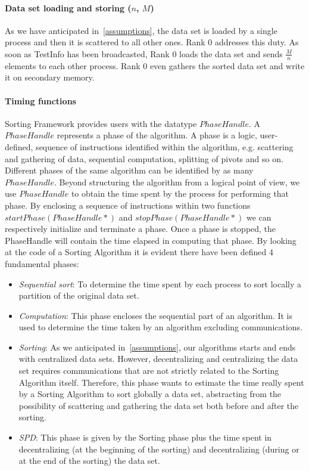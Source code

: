 \paragraph{Data set loading and storing ($n$, $M$)} As we have anticipated in~\ref{assumptions}, the data set is loaded by a single process and then it is scattered to all other ones. Rank $0$ addresses this duty. As soon as TestInfo has been broadcasted, Rank $0$ loads the data set and sends $\frac{M}{n}$ elements to each other process. Rank $0$ even gathers the sorted data set and write it on secondary memory.

\paragraph{Timing functions} Sorting Framework provides users with the datatype $PhaseHandle$. A $PhaseHandle$ represents a phase of the algorithm. A phase is a logic, user-defined, sequence of instructions identified within the algorithm,  e.g. scattering and gathering of data, sequential computation, splitting of pivots and so on. Different phases of the same algorithm can be identified by as many $PhaseHandle$. Beyond structuring the algorithm from a logical point of view, we use $PhaseHandle$ to obtain the time spent by the process for performing that phase. By enclosing a sequence of instructions within two functions $startPhase(PhaseHandle*)$ and $stopPhase(PhaseHandle*)$ we can respectively initialize and terminate a phase. Once a phase is stopped, the PhaseHandle will contain the time elapsed in computing that phase. By looking at the code of a Sorting Algorithm it is evident there have been defined 4 fundamental phases: 
\begin{itemize}
\item \textit{Sequential sort}: To determine the time spent by each process to sort locally a partition of the original data set. 
\item \textit{Computation}: This phase encloses the sequential part of an algorithm. It is used to determine the time taken by an algorithm excluding communications.
\item \textit{Sorting}: As we anticipated in~\ref {assumptions}, our algorithms starts and ends with centralized data sets. However, decentralizing and centralizing the data set requires communications that are not strictly related to the Sorting Algorithm itself. Therefore, this phase wants to estimate the time really spent by a Sorting Algorithm to sort globally a data set, abstracting from the possibility of scattering and gathering the data set both before and after the sorting.
\item \textit{SPD}: This phase is given by the Sorting phase plus the time spent in decentralizing (at the beginning of the sorting) and decentralizing (during or at the end of the sorting) the data set.
\end{itemize}
